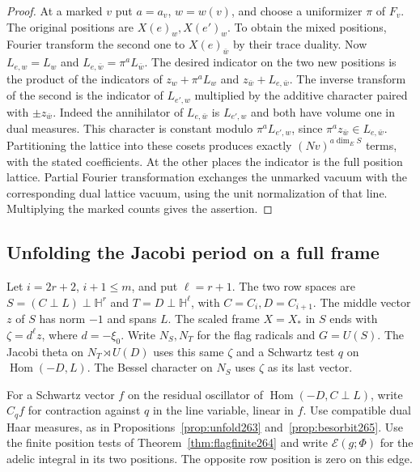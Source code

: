 \documentclass[a4paper,11pt]{article}
\theoremstyle{definition}
\theoremstyle{remark}
\numberwithin{equation}{section}
\begin{document}
\begin{proof}
At a marked \(v\) put \(a=a_v\), \(w=w(v)\), and choose a
uniformizer \(\pi\) of \(F_v\). The original positions are
\(X(e)_w,X(e')_w\). To obtain the mixed positions, Fourier
transform the second one to \(X(e)_{\bar w}\) by their trace
duality. Now \(L_{e,w}=L_w\) and
\(L_{e,\bar w}=\pi^a L_{\bar w}\). The desired indicator
on the two new positions is the product of the indicators of
\(z_w+\pi^a L_w\) and \(z_{\bar w}+L_{e,\bar w}\).
The inverse transform of the second is the indicator of
\(L_{e',w}\) multiplied by the additive character paired with
\(\pm z_{\bar w}\). Indeed the annihilator of \(L_{e,\bar w}\)
is \(L_{e',w}\) and both have volume one in dual measures.
This character is constant modulo \(\pi^a L_{e',w}\), since
\(\pi^a z_{\bar w}\in L_{e,\bar w}\). Partitioning the lattice
into these cosets produces exactly \((Nv)^{a\dim_E S}\) terms,
with the stated coefficients. At the other places the indicator
is the full position lattice. Partial Fourier transformation
exchanges the unmarked vacuum with the corresponding dual
lattice vacuum, using the unit normalization of that line.
Multiplying the marked counts gives the assertion.
\end{proof}

\subsection{Unfolding the Jacobi period on a full frame}\label{nav:II-53}
Let \(i=2r+2\), \(i+1\le m\), and put \(\ell=r+1\).
The two row spaces are \(S=(C\perp L)\perp\mathbb H^r\)
and \(T=D\perp\mathbb H^\ell\), with \(C=C_i,D=C_{i+1}\).
The middle vector \(z\) of \(S\) has norm \(-1\) and spans
\(L\). The scaled frame \(X=X_*\) in \(S\) ends with
\(\zeta=d^\ell z\), where \(d=-\xi_0\).
Write \(N_S,N_T\) for the flag radicals and \(G=U(S)\).
The Jacobi theta on \(N_T\rtimes U(D)\) uses this same
\(\zeta\) and a Schwartz test \(q\) on
\(\operatorname{Hom}(-D,L)\). The Bessel character on
\(N_S\) uses \(\zeta\) as its last vector.

For a Schwartz vector \(f\) on the residual oscillator of
\(\operatorname{Hom}(-D,C\perp L)\), write \(C_q f\) for
contraction against \(q\) in the line variable, linear in
\(f\). Use compatible dual Haar measures, as in
Propositions~\ref{prop:unfold263} and~\ref{prop:besorbit265}.
Use the finite position tests of
Theorem~\ref{thm:flagfinite264} and write \(\mathcal E(g;\Phi)\)
for the adelic integral in its two positions. The opposite
row position is zero on this edge.
\end{document}

